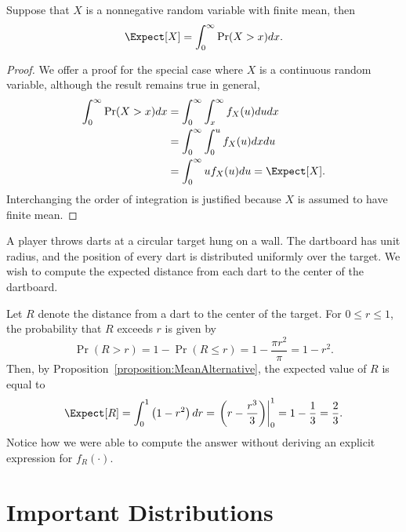 \begin{proposition} \label{proposition:MeanAlternative}
Suppose that $X$ is a nonnegative random variable with finite mean, then
\begin{equation*}
\Expect [X] = \int_0^{\infty} \Pr (X > x) dx .
\end{equation*}
\end{proposition}
\begin{proof}
We offer a proof for the special case where $X$ is a continuous random variable, although the result remains true in general,
\begin{equation*}
\begin{split}
\int_0^{\infty} \Pr (X > x) dx
&= \int_0^{\infty} \int_x^{\infty} f_X(u) du dx \\
&= \int_0^{\infty} \int_0^{u} f_X(u) dx du \\
&= \int_0^{\infty} u f_X(u) du
= \Expect [X] .
\end{split}
\end{equation*}
Interchanging the order of integration is justified because $X$ is assumed to have finite mean.
\end{proof}

\begin{example}
A player throws darts at a circular target hung on a wall.
The dartboard has unit radius, and the position of every dart is distributed uniformly over the target.
We wish to compute the expected distance from each dart to the center of the dartboard.

Let $R$ denote the distance from a dart to the center of the target.
For $0 \leq r \leq 1$, the probability that $R$ exceeds $r$ is given by
\begin{equation*}
\Pr (R > r) = 1 - \Pr (R \leq r) = 1 - \frac{\pi r^2}{\pi} = 1 - r^2 .
\end{equation*}
Then, by Proposition~\ref{proposition:MeanAlternative}, the expected value of $R$ is equal to
\begin{equation*}
\Expect [R] = \int_0^1 \left( 1 - r^2 \right) dr
= \left.  \left( r - \frac{r^3}{3} \right) \right|_0^1
= 1 - \frac{1}{3} = \frac{2}{3} .
\end{equation*}
Notice how we were able to compute the answer without deriving an explicit expression for $f_R (\cdot)$.
\end{example}


\section{Important Distributions}

